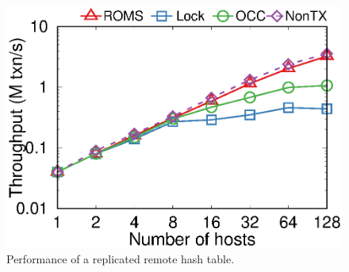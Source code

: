 \begin{figure}[t]
\begin{minipage}[]{.32\textwidth}
        \includegraphics[width=\textwidth]{gnuplot/tpcc-neworder.eps}
        \vspace{-15pt}
    	\caption{Performance of a replicated remote hash table.}
    	\label{fig:tpcc-neworder}
    \end{minipage}
    \vspace{-15pt}
\end{figure}

